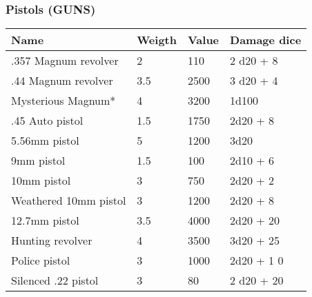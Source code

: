 
\subsubsection{Pistols (GUNS)}
\begin{longtable}{|p{4cm}|p{1.5cm}|p{1.5cm}|p{9cm}|}
\hline
\bfseries Name & \bfseries Weigth & \bfseries Value & \bfseries Damage dice \\
\hline
\endhead
.357 Magnum revolver  & 2 & 110 & 2 d20 + 8 \\
.44 Magnum revolver  & 3.5  & 2500 & 3 d20  +  4 \\
Mysterious Magnum*  & 4 & 3200 & 1d100 \\
.45 Auto pistol  & 1.5  & 1750 & 2d20  +  8 \\
5.56mm pistol  & 5 & 1200 & 3d20 \\
9mm pistol  & 1.5  & 100 & 2d10 +  6 \\
10mm pistol  & 3 & 750 & 2d20  + 2 \\
Weathered 10mm pistol  & 3 & 1200 & 2d20 +  8 \\
12.7mm pistol  & 3.5  & 4000 & 2d20 + 20 \\
Hunting revolver & 4 & 3500 & 3d20 +  25 \\
Police pistol  & 3 & 1000 & 2d20 +  1 0 \\
Silenced .22 pistol  & 3 & 80 & 2 d20  + 20 \\
\hline
\end{longtable}
